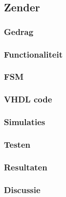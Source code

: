 \subsection{Zender}

\subsubsection{Gedrag}

\subsubsection{Functionaliteit}

\subsubsection{FSM}

\subsubsection{VHDL code}

\subsubsection{Simulaties}

\subsubsection{Testen}

\subsubsection{Resultaten}

\subsubsection{Discussie}

